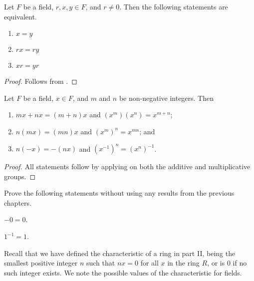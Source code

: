 \begin{proposition}
    Let $F$ be a field, $r, x, y \in F$, and $r \neq 0$. Then the following statements are equivalent.
    \begin{enumerate}
        \item $x = y$
        \item $rx = ry$
        \item $xr = yr$
    \end{enumerate}
\end{proposition}
\begin{proof}
    Follows from .
\end{proof}



\begin{proposition}
    Let $F$ be a field, $x \in F$, and $m$ and $n$ be non-negative integers. Then
    \begin{enumerate}
        \item $mx + nx = (m+n)x$ and $(x^m)(x^n) = x^{m+n}$;
        \item $n(mx) = (mn)x$ and $(x^m)^n = x^{mn}$; and
        \item $n(-x) = -(nx)$ and $(x^{-1})^n = (x^n)^{-1}$.
    \end{enumerate}
\end{proposition}
\begin{proof}
    All statements follow by applying  on both the additive and multiplicative groups.
\end{proof}

\begin{exercise}\label{exercise-inverse-of-additive-and-multiplicative-identities-are-themselves}
    Prove the following statements without using any results from the previous chapters.
    \begin{partquestions}{\alph*}
        \item $-0 = 0$.
        \item $1^{-1} = 1$.
    \end{partquestions}
\end{exercise}

Recall that we have defined the characteristic of a ring in part II, being the smallest positive integer $n$ such that $nx = 0$ for all $x$ in the ring $R$, or is 0 if no such integer exists. We note the possible values of the characteristic for fields.


